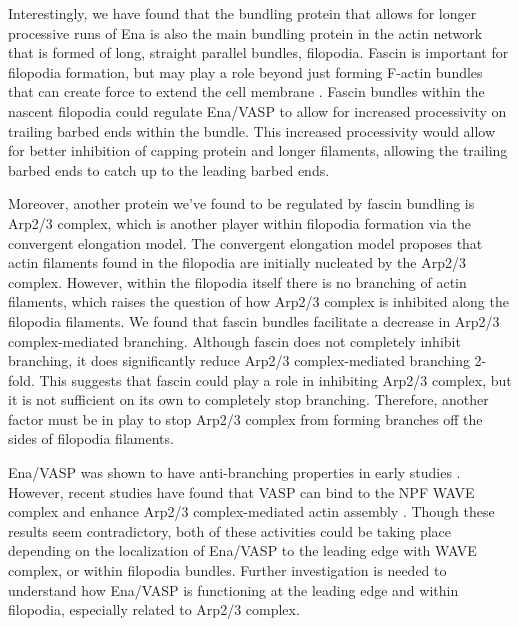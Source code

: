 Interestingly, we have found that the bundling protein that allows for longer processive runs of Ena is also the main bundling protein in the actin network that is formed of long, straight parallel bundles, filopodia. Fascin is important for filopodia formation, but may play a role beyond just forming F-actin bundles that can create force to extend the cell membrane \citep{vignjevic_role_2006,cant_drosophila_1994}. Fascin bundles within the nascent filopodia could regulate Ena/VASP to allow for increased processivity on trailing barbed ends within the bundle. This increased processivity would allow for better inhibition of capping protein and longer filaments, allowing the trailing barbed ends to catch up to the leading barbed ends. 

Moreover, another protein we've found to be regulated by fascin bundling is Arp2/3 complex, which is another player within filopodia formation via the convergent elongation model. The convergent elongation model proposes that actin filaments found in the filopodia are initially nucleated by the Arp2/3 complex. However, within the filopodia itself there is no branching of actin filaments, which raises the question of how Arp2/3 complex is inhibited along the filopodia filaments. We found that fascin bundles facilitate a decrease in Arp2/3 complex-mediated branching. Although fascin does not completely inhibit branching, it does significantly reduce Arp2/3 complex-mediated branching 2-fold. This suggests that fascin could play a role in inhibiting Arp2/3 complex, but it is not sufficient on its own to completely stop branching. Therefore, another factor must be in play to stop Arp2/3 complex from forming branches off the sides of filopodia filaments. 

Ena/VASP was shown to have anti-branching properties in early studies \citep{bear_antagonism_2002,plastino_actin_2004,samarin_how_2003, skoble_pivotal_2001}. However, recent studies have found that VASP can bind to the NPF WAVE complex and enhance Arp2/3 complex-mediated actin assembly \citep{chen_ena/vasp_2014,havrylenko_wave_2015}. Though these results seem contradictory, both of these activities could be taking place depending on the localization of Ena/VASP to the leading edge with WAVE complex, or within filopodia bundles. Further investigation is needed to understand how Ena/VASP is functioning at the leading edge and within filopodia, especially related to Arp2/3 complex.

